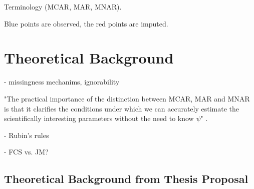 \documentclass[article]{jss}
\begin{document}



Terminology (MCAR, MAR, MNAR). 

Blue points are observed, the red points are imputed. 



\section{Theoretical Background} \label{sec:background}

- missingness mechanims, ignorability

"The practical importance of the distinction between MCAR, MAR and MNAR is that it clarifies the conditions under which we can accurately estimate the scientifically interesting parameters without the need to know $\psi$" \cite[par.~2.2]{buur18}.

- Rubin's rules

- FCS vs. JM?

\subsection{Theoretical Background from Thesis Proposal}
\end{document}
